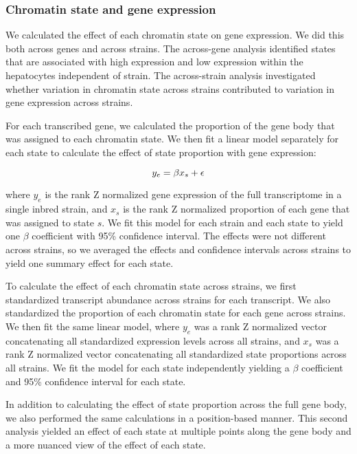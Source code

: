 \documentclass[10pt,letterpaper]{article}
\begin{document}
\hypertarget{chromatin-state-and-gene-expression}{%
\subsubsection{Chromatin state and gene
expression}\label{chromatin-state-and-gene-expression}}

We calculated the effect of each chromatin state on gene expression. We
did this both across genes and across strains. The across-gene analysis
identified states that are associated with high expression and low
expression within the hepatocytes independent of strain. The
across-strain analysis investigated whether variation in chromatin state
across strains contributed to variation in gene expression across
strains.

For each transcribed gene, we calculated the proportion of the gene body
that was assigned to each chromatin state. We then fit a linear model
separately for each state to calculate the effect of state proportion
with gene expression:

\begin{equation*}{\label{eqn:chromatin_effect}}
y_{e} = \beta x_{s} + \epsilon
\end{equation*}

where \(y_{e}\) is the rank Z normalized gene expression of the full
transcriptome in a single inbred strain, and \(x_{s}\) is the rank Z
normalized proportion of each gene that was assigned to state \(s\). We
fit this model for each strain and each state to yield one \(\beta\)
coefficient with 95\% confidence interval. The effects were not
different across strains, so we averaged the effects and confidence
intervals across strains to yield one summary effect for each state.

To calculate the effect of each chromatin state across strains, we first
standardized transcript abundance across strains for each transcript. We
also standardized the proportion of each chromatin state for each gene
across strains. We then fit the same linear model, where \(y_{e}\) was a
rank Z normalized vector concatenating all standardized expression
levels across all strains, and \(x_{s}\) was a rank Z normalized vector
concatenating all standardized state proportions across all strains. We
fit the model for each state independently yielding a \(\beta\)
coefficient and 95\% confidence interval for each state.

In addition to calculating the effect of state proportion across the
full gene body, we also performed the same calculations in a
position-based manner. This second analysis yielded an effect of each
state at multiple points along the gene body and a more nuanced view of
the effect of each state.
\end{document}
